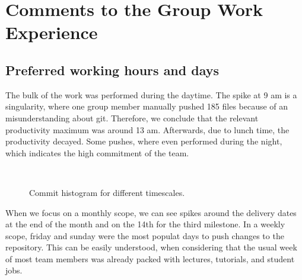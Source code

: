 \section{Comments to the Group Work Experience}

\subsection*{Preferred working hours and days}

The bulk of the work was performed during the daytime. The spike at 9 am is a singularity, where one group member manually pushed 185 files because of an misunderstanding about git. Therefore, we conclude that the relevant productivity maximum was around 13 am. Afterwards, due to lunch time, the productivity decayed. Some pushes, where even performed during the night, which indicates the high commitment of the team.
\begin{figure}[h!]
\centering
{}
\\
\caption{Commit histogram for different timescales.}
\label{fig:hour_commits}
\end{figure}
When we focus on a monthly scope, we can see spikes around the delivery dates at the end of the month and on the 14th for the third milestone. In a weekly scope, friday and sunday were the most populat days to push changes to the repository. This can be easily understood, when considering that the usual week of most team members was already packed with lectures, tutorials, and student jobs.

